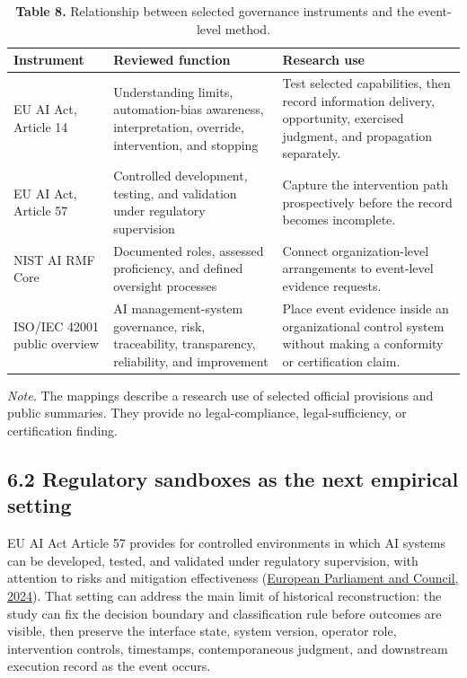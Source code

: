 \documentclass[11pt]{article}
\begin{document}
\begin{table}[!htbp]
\centering
\caption*{\textcolor{TAENavy}{\textbf{Table 8.}} Relationship between selected governance instruments and the event-level method.}
\footnotesize
{}
\begin{tabularx}{\linewidth}{@{}>{\raggedright\arraybackslash}p{}>{\raggedright\arraybackslash}p{}>{\raggedright\arraybackslash}X@{}}
\toprule
\rowcolor{TAEPaleNavy}
\textcolor{TAENavy}{\textbf{Instrument}} & \textcolor{TAENavy}{\textbf{Reviewed function}} & \textcolor{TAENavy}{\textbf{Research use}} \\
\midrule
EU AI Act, Article 14 & Understanding limits, automation-bias awareness, interpretation, override, intervention, and stopping & Test selected capabilities, then record information delivery, opportunity, exercised judgment, and propagation separately. \\
EU AI Act, Article 57 & Controlled development, testing, and validation under regulatory supervision & Capture the intervention path prospectively before the record becomes incomplete. \\
NIST AI RMF Core & Documented roles, assessed proficiency, and defined oversight processes & Connect organization-level arrangements to event-level evidence requests. \\
ISO/IEC 42001 public overview & AI management-system governance, risk, traceability, transparency, reliability, and improvement & Place event evidence inside an organizational control system without making a conformity or certification claim. \\
\bottomrule
\end{tabularx}
\par\vspace{2pt}\footnotesize\textit{Note.} The mappings describe a research use of selected official provisions and public summaries. They provide no legal-compliance, legal-sufficiency, or certification finding.
\end{table}

\subsection*{6.2 Regulatory sandboxes as the next empirical setting}
EU AI Act Article 57 provides for controlled environments in which AI systems can be developed, tested, and validated under regulatory supervision, with attention to risks and mitigation effectiveness (\href{https://eur-lex.europa.eu/eli/reg/2024/1689/oj}{European Parliament and Council, 2024}). That setting can address the main limit of historical reconstruction: the study can fix the decision boundary and classification rule before outcomes are visible, then preserve the interface state, system version, operator role, intervention controls, timestamps, contemporaneous judgment, and downstream execution record as the event occurs.
\end{document}

